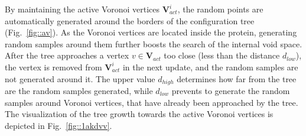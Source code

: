 \documentclass[usletter, 10pt, conference]{svjour3}      %
\def\VVA{\mathbf{V}_{act}}
\def\da{d_{high}}
\def\db{d_{low}}
\begin{document}
By maintaining the active Voronoi vertices $\VVA^i$, the random points are automatically generated around the borders of the configuration tree (Fig.~\ref{fig::av}).
As the Voronoi vertices are located inside the protein, generating random samples around them further boosts the search of the internal void space.
After the tree approaches a vertex $v \in \VVA$ too close (less than the distance $\db$), the vertex is removed from $\VVA^i$ in the next update, and the random samples are not generated around it.
The upper value $\da$ determines how far from the tree are the random samples generated, while $\db$ prevents to generate the random samples around Voronoi vertices, that have already been approached by the tree.
The visualization of the tree growth towards the active Voronoi vertices is depicted in Fig.~\ref{fig::1akdvv}.
\end{document}
